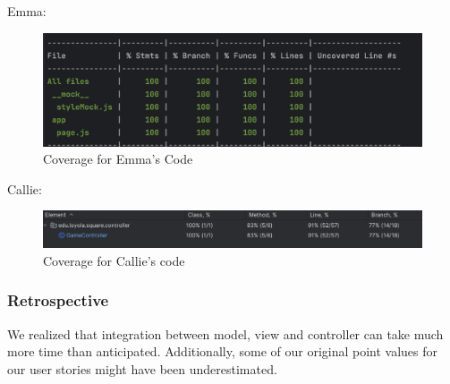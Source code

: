 Emma:
\begin{figure}[!hbt]
    \centering
    \includegraphics[width=1.0\linewidth]{figures/EmmaTest.png}
    \caption{Coverage for Emma's Code}
    \label{Emma Coverage}
\end{figure}

Callie:
\begin{figure}[!hbt]
    \centering
    \includegraphics[width=1.0\linewidth]{figures/CallieTest.png}
    \caption{Coverage for Callie's code}
    \label{Callie Coverage}
\end{figure}



\subsubsection{Retrospective}
We realized that integration between model, view and controller can take much more time than anticipated. Additionally, some of our original point values for our user stories might have been underestimated.




